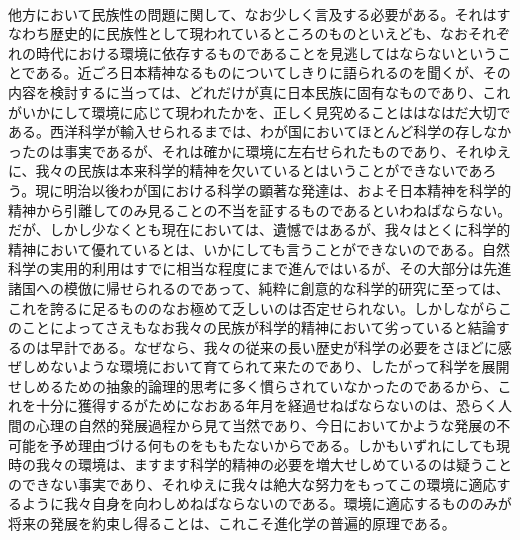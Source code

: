 \documentclass[8pt]{extreport}
\begin{document}
\begin{CJK}{UTF8}{min}
\\	他方において民族性の問題に関して、なお少しく言及する必要がある。それはすなわち歴史的に民族性として現われているところのものといえども、なおそれぞれの時代における環境に依存するものであることを見逃してはならないということである。近ごろ日本精神なるものについてしきりに語られるのを聞くが、その内容を検討するに当っては、どれだけが真に日本民族に固有なものであり、これがいかにして環境に応じて現われたかを、正しく見究めることははなはだ大切である。西洋科学が輸入せられるまでは、わが国においてほとんど科学の存しなかったのは事実であるが、それは確かに環境に左右せられたものであり、それゆえに、我々の民族は本来科学的精神を欠いているとはいうことができないであろう。現に明治以後わが国における科学の顕著な発達は、およそ日本精神を科学的精神から引離してのみ見ることの不当を証するものであるといわねばならない。だが、しかし少なくとも現在においては、遺憾ではあるが、我々はとくに科学的精神において優れているとは、いかにしても言うことができないのである。自然科学の実用的利用はすでに相当な程度にまで進んではいるが、その大部分は先進諸国への模倣に帰せられるのであって、純粋に創意的な科学的研究に至っては、これを誇るに足るもののなお極めて乏しいのは否定せられない。しかしながらこのことによってさえもなお我々の民族が科学的精神において劣っていると結論するのは早計である。なぜなら、我々の従来の長い歴史が科学の必要をさほどに感ぜしめないような環境において育てられて来たのであり、したがって科学を展開せしめるための抽象的論理的思考に多く慣らされていなかったのであるから、これを十分に獲得するがためになおある年月を経過せねばならないのは、恐らく人間の心理の自然的発展過程から見て当然であり、今日においてかような発展の不可能を予め理由づける何ものをももたないからである。しかもいずれにしても現時の我々の環境は、ますます科学的精神の必要を増大せしめているのは疑うことのできない事実であり、それゆえに我々は絶大な努力をもってこの環境に適応するように我々自身を向わしめねばならないのである。環境に適応するもののみが将来の発展を約束し得ることは、これこそ進化学の普遍的原理である。

\end{CJK}
\end{document}
